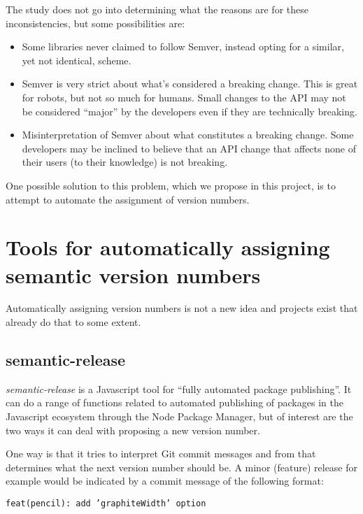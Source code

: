 \documentclass{l4proj}
\begin{document}
The study does not go into determining what the reasons are for these
inconsistencies, but some possibilities are:
\begin{itemize}
\item Some libraries never claimed to follow Semver, instead opting
for a similar, yet not identical, scheme.
\item Semver is very strict about what's considered a breaking change.
This is great for robots, but not so much for humans. Small changes to
the API may not be considered ``major'' by the developers even if they
are technically breaking.
\item Misinterpretation of Semver about what constitutes a breaking
change. Some developers may be inclined to believe that an API change
that affects none of their users (to their knowledge) is not breaking.
\end{itemize}

One possible solution to this problem, which we propose in this
project, is to attempt to automate the assignment of version numbers.

\section{Tools for automatically assigning semantic version numbers}

Automatically assigning version numbers is not a new idea and projects
exist that already do that to some extent.

\subsection{semantic-release}

\textit{semantic-release}\cite{SemanticRelease} is a Javascript tool
for ``fully automated package publishing''. It can do a range of
functions related to automated publishing of packages in the
Javascript ecosystem through the Node Package Manager, but of interest
are the two ways it can deal with proposing a new version number.

One way is that it tries to interpret Git commit messages and from
that determines what the next version number should be. A minor
(feature) release for example would be indicated by a commit message
of the following format:

\begin{center}
\texttt{feat(pencil): add 'graphiteWidth' option}
\end{center}
\end{document}
